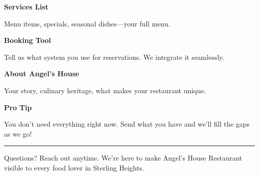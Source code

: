 \documentclass[11pt,letterpaper]{article}
\begin{document}
\begin{minipage}[t]{0.48\textwidth}
\begin{tcolorbox}[colframe=accent-teal, boxrule=1pt, left=0.7em, right=0.7em, top=0.5em, bottom=0.5em, arc=4pt, boxsep=0pt]
{\bfseries\small\color{accent-teal}Services List}

\vspace{0.15em}

{\small Menu items, specials, seasonal dishes—your full menu.}
\end{tcolorbox}

\vspace{0.1em}

\begin{tcolorbox}[colframe=accent-teal, boxrule=1pt, left=0.7em, right=0.7em, top=0.5em, bottom=0.5em, arc=4pt, boxsep=0pt]
{\bfseries\small\color{accent-teal}Booking Tool}

\vspace{0.15em}

{\small Tell us what system you use for reservations. We integrate it seamlessly.}
\end{tcolorbox}

\vspace{0.1em}

\begin{tcolorbox}[colframe=accent-teal, boxrule=1pt, left=0.7em, right=0.7em, top=0.5em, bottom=0.5em, arc=4pt, boxsep=0pt]
{\bfseries\small\color{accent-teal}About Angel's House}

\vspace{0.15em}

{\small Your story, culinary heritage, what makes your restaurant unique.}
\end{tcolorbox}

\vspace{-0.2em}
\end{minipage}

\vspace{0.15em}

\begin{tcolorbox}[colback={accent-red!5}, colframe=accent-red!20, boxrule=0.5pt, left=0.7em, right=0.7em, top=0.4em, bottom=0.4em, arc=6pt, boxsep=0pt]

{\bfseries\small\color{accent-red}Pro Tip}

\vspace{0.1em}

{\small You don't need everything right now. Send what you have and we'll fill the gaps as we go!}

\end{tcolorbox}

\vspace{0.15em}

\noindent\hrule
\vspace{0.2em}

{\small\color{text-light}Questions? Reach out anytime. We're here to make Angel's House Restaurant visible to every food lover in Sterling Heights.}
\end{document}
